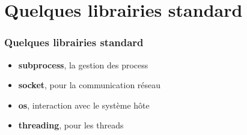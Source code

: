\section{Quelques librairies standard}
\begin{frame}[fragile]
  \frametitle{Quelques librairies standard}
  \begin{itemize}
    \item<1-> {\bf subprocess}, la gestion des process
    \item<2-> {\bf socket}, pour la communication réseau
    \item<3-> {\bf os}, interaction avec le système hôte
    \item<4-> {\bf threading}, pour les threads
  \end{itemize}
\end{frame}
